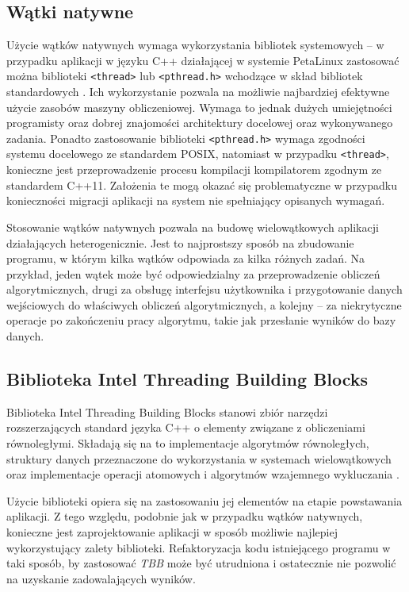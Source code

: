\subsection{Wątki natywne}

Użycie wątków natywnych wymaga wykorzystania bibliotek systemowych -- w przypadku aplikacji w języku C++ działającej w systemie PetaLinux zastosować można biblioteki \texttt{<thread>} lub \texttt{<pthread.h>} wchodzące w skład bibliotek standardowych \cite{Williams2013}.
Ich wykorzystanie pozwala na możliwie najbardziej efektywne użycie zasobów maszyny obliczeniowej. 
Wymaga to jednak dużych umiejętności programisty oraz dobrej znajomości architektury docelowej oraz wykonywanego zadania. 
Ponadto zastosowanie biblioteki \texttt{<pthread.h>} wymaga zgodności systemu docelowego ze standardem POSIX, natomiast w przypadku \texttt{<thread>}, konieczne jest przeprowadzenie procesu kompilacji kompilatorem zgodnym ze standardem C++11. 
Założenia te mogą okazać się problematyczne w przypadku konieczności migracji aplikacji na system nie spełniający opisanych wymagań.

Stosowanie wątków natywnych pozwala na budowę wielowątkowych aplikacji działających heterogenicznie. 
Jest to najprostszy sposób na zbudowanie programu, w którym kilka wątków odpowiada za kilka różnych zadań. 
Na przykład, jeden wątek może być odpowiedzialny za przeprowadzenie obliczeń algorytmicznych, drugi za obsługę interfejsu użytkownika i przygotowanie danych wejściowych do właściwych obliczeń algorytmicznych, a kolejny -- za niekrytyczne operacje po zakończeniu pracy algorytmu, takie jak przesłanie wyników do bazy danych.

\subsection{Biblioteka Intel Threading Building Blocks}

Biblioteka Intel Threading Building Blocks stanowi zbiór narzędzi rozszerzających standard języka C++ o elementy związane z obliczeniami równoległymi. 
Składają się na to implementacje algorytmów równoległych, struktury danych przeznaczone do wykorzystania w systemach wielowątkowych oraz implementacje operacji atomowych i algorytmów wzajemnego wykluczania \cite{Reinders2010}.

Użycie biblioteki opiera się na zastosowaniu jej elementów na etapie powstawania aplikacji. 
Z tego względu, podobnie jak w przypadku wątków natywnych, konieczne jest zaprojektowanie aplikacji w sposób możliwie najlepiej wykorzystujący zalety biblioteki. 
Refaktoryzacja kodu istniejącego programu w taki sposób, by zastosować \emph{TBB} może być utrudniona i ostatecznie nie pozwolić na uzyskanie zadowalających wyników.


